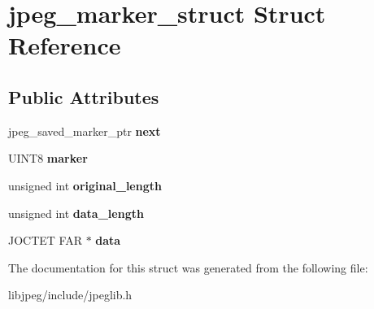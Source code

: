 \hypertarget{structjpeg__marker__struct}{\section{jpeg\-\_\-marker\-\_\-struct Struct Reference}
\label{structjpeg__marker__struct}
}
\subsection*{Public Attributes}
\begin{DoxyCompactItemize}
\item 
\hypertarget{structjpeg__marker__struct_a1cb619806ea91b42a46b2a04fafabd82}{jpeg\-\_\-saved\-\_\-marker\-\_\-ptr {\bfseries next}}\label{structjpeg__marker__struct_a1cb619806ea91b42a46b2a04fafabd82}

\item 
\hypertarget{structjpeg__marker__struct_a154cf70fc9b4f86da631ca08a12a8d33}{U\-I\-N\-T8 {\bfseries marker}}\label{structjpeg__marker__struct_a154cf70fc9b4f86da631ca08a12a8d33}

\item 
\hypertarget{structjpeg__marker__struct_a3b17d58a17fa6be8560b697da814dfd3}{unsigned int {\bfseries original\-\_\-length}}\label{structjpeg__marker__struct_a3b17d58a17fa6be8560b697da814dfd3}

\item 
\hypertarget{structjpeg__marker__struct_a98412e9bccde6954ce55f611ad146a6b}{unsigned int {\bfseries data\-\_\-length}}\label{structjpeg__marker__struct_a98412e9bccde6954ce55f611ad146a6b}

\item 
\hypertarget{structjpeg__marker__struct_a3d91d1b1c95f2d039d17209484fd7a91}{J\-O\-C\-T\-E\-T F\-A\-R $\ast$ {\bfseries data}}\label{structjpeg__marker__struct_a3d91d1b1c95f2d039d17209484fd7a91}

\end{DoxyCompactItemize}


The documentation for this struct was generated from the following file\-:\begin{DoxyCompactItemize}
\item 
libjpeg/include/jpeglib.\-h\end{DoxyCompactItemize}

